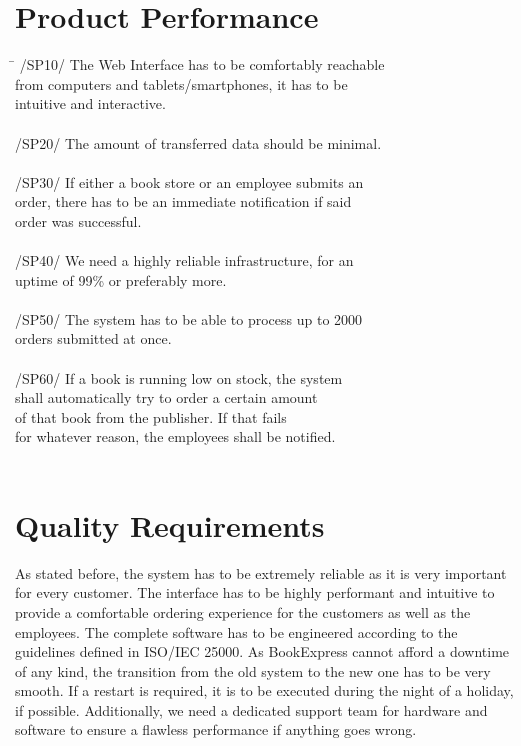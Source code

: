 \documentclass[11pt,a4paper,oneside,svgnames]{report}
\begin{document}
\section{Product Performance}
\begin{tabbing}
\hspace{3cm}\=\kill
	/SP10/ \> The Web Interface has to be comfortably reachable\\
	\> from computers and tablets/smartphones, it has to be \\
	\> intuitive and interactive.\\
	\\
	/SP20/ \> The amount of transferred data should be minimal.\\
	\\
	/SP30/ \> If either a book store or an employee submits an \\
	\> order, there has to be an immediate notification if said\\
	\> order was successful.\\
	\\
	/SP40/ \> We need a highly reliable infrastructure, for an \\
	\> uptime of 99\% or preferably more. \\
	\\
	/SP50/ \> The system has to be able to process up to 2000\\
	\> orders submitted at once.\\
	\\
	/SP60/ \> If a book is running low on stock, the system\\
	\> shall automatically try to order a certain amount \\
	\> of that book from the publisher.  If that fails\\
	\> for whatever reason, the employees shall be notified.\\
	\\
\end{tabbing} 
\section{Quality Requirements}
As stated before, the system has to be extremely reliable as it is very important for every customer. The interface has to be highly performant and intuitive to provide a comfortable ordering experience for the customers as well as the employees. The complete software has to be engineered according to the guidelines defined in ISO/IEC 25000. As BookExpress cannot afford a downtime of any kind, the transition from the old system to the new one has to be very smooth. If a restart is required, it is to be executed during the night of a holiday, if possible. Additionally, we need a dedicated support team for hardware and software to ensure a flawless performance if anything goes wrong.
\end{document}

